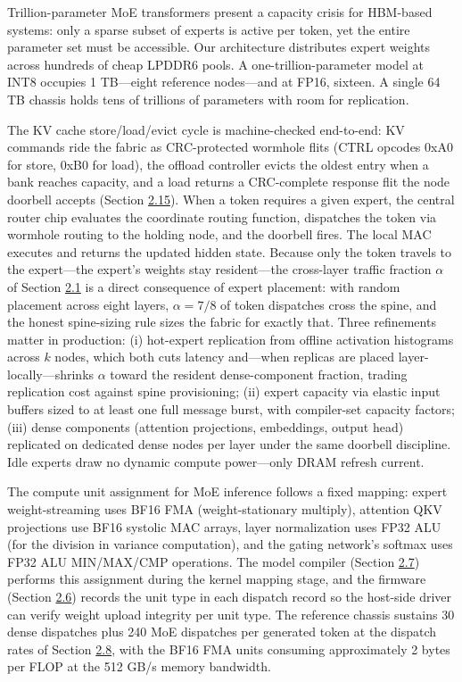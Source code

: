 \documentclass[10pt,twocolumn]{article}
\begin{document}
Trillion-parameter MoE transformers present a capacity crisis for HBM-based systems: only a sparse subset of experts is active per token, yet the entire parameter set must be accessible\cite{3,4}. Our architecture distributes expert weights across hundreds of cheap LPDDR6 pools. A one-trillion-parameter model at INT8 occupies 1 TB---eight reference nodes---and at FP16, sixteen. A single 64 TB chassis holds tens of trillions of parameters with room for replication.

The KV cache store/load/evict cycle is machine-checked end-to-end: KV commands ride the fabric as CRC-protected wormhole flits (CTRL opcodes 0xA0 for store, 0xB0 for load), the offload controller evicts the oldest entry when a bank reaches capacity, and a load returns a CRC-complete response flit the node doorbell accepts (Section \hyperref[sec:2.15]{2.15}). When a token requires a given expert, the central router chip evaluates the coordinate routing function, dispatches the token via wormhole routing to the holding node, and the doorbell fires. The local MAC executes and returns the updated hidden state. Because only the token travels to the expert---the expert's weights stay resident---the cross-layer traffic fraction $\alpha$ of Section \hyperref[sec:2.1]{2.1} is a direct consequence of expert placement: with random placement across eight layers, $\alpha = 7/8$ of token dispatches cross the spine, and the honest spine-sizing rule sizes the fabric for exactly that. Three refinements matter in production: (i) hot-expert replication from offline activation histograms across $k$ nodes, which both cuts latency and---when replicas are placed layer-locally---shrinks $\alpha$ toward the resident dense-component fraction, trading replication cost against spine provisioning; (ii) expert capacity via elastic input buffers sized to at least one full message burst, with compiler-set capacity factors; (iii) dense components (attention projections, embeddings, output head) replicated on dedicated dense nodes per layer under the same doorbell discipline. Idle experts draw no dynamic compute power---only DRAM refresh current.

The compute unit assignment for MoE inference follows a fixed mapping: expert weight-streaming uses BF16 FMA (weight-stationary multiply), attention QKV projections use BF16 systolic MAC arrays, layer normalization uses FP32 ALU (for the division in variance computation), and the gating network's softmax uses FP32 ALU MIN/MAX/CMP operations. The model compiler (Section \hyperref[sec:2.7]{2.7}) performs this assignment during the kernel mapping stage, and the firmware (Section \hyperref[sec:2.6]{2.6}) records the unit type in each dispatch record so the host-side driver can verify weight upload integrity per unit type. The reference chassis sustains 30 dense dispatches plus 240 MoE dispatches per generated token at the dispatch rates of Section \hyperref[sec:2.8]{2.8}, with the BF16 FMA units consuming approximately 2 bytes per FLOP at the 512 GB/s memory bandwidth.
\end{document}
